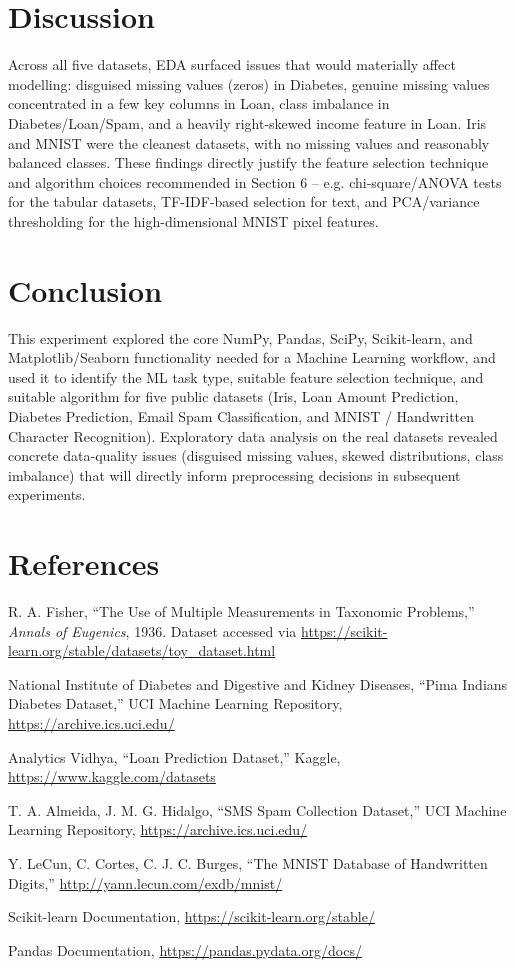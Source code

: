 \documentclass[12pt,a4paper]{article}
\begin{document}
\section{Discussion}
Across all five datasets, EDA surfaced issues that would materially affect modelling: disguised
missing values (zeros) in Diabetes, genuine missing values concentrated in a few key columns
in Loan, class imbalance in Diabetes/Loan/Spam, and a heavily right-skewed income feature in
Loan. Iris and MNIST were the cleanest datasets, with no missing values and reasonably
balanced classes. These findings directly justify the feature selection technique and
algorithm choices recommended in Section 6 -- e.g. chi-square/ANOVA tests for the tabular
datasets, TF-IDF-based selection for text, and PCA/variance thresholding for the
high-dimensional MNIST pixel features.

\section{Conclusion}
This experiment explored the core NumPy, Pandas, SciPy, Scikit-learn, and Matplotlib/Seaborn
functionality needed for a Machine Learning workflow, and used it to identify the ML task
type, suitable feature selection technique, and suitable algorithm for five public datasets
(Iris, Loan Amount Prediction, Diabetes Prediction, Email Spam Classification, and MNIST /
Handwritten Character Recognition). Exploratory data analysis on the real datasets revealed
concrete data-quality issues (disguised missing values, skewed distributions, class
imbalance) that will directly inform preprocessing decisions in subsequent experiments.

\section{References}
\begin{enumerate}[label={[\arabic*]}]
\item R. A. Fisher, ``The Use of Multiple Measurements in Taxonomic Problems,'' \textit{Annals of Eugenics}, 1936. Dataset accessed via \url{https://scikit-learn.org/stable/datasets/toy_dataset.html}
\item National Institute of Diabetes and Digestive and Kidney Diseases, ``Pima Indians Diabetes Dataset,'' UCI Machine Learning Repository, \url{https://archive.ics.uci.edu/}
\item Analytics Vidhya, ``Loan Prediction Dataset,'' Kaggle, \url{https://www.kaggle.com/datasets}
\item T. A. Almeida, J. M. G. Hidalgo, ``SMS Spam Collection Dataset,'' UCI Machine Learning Repository, \url{https://archive.ics.uci.edu/}
\item Y. LeCun, C. Cortes, C. J. C. Burges, ``The MNIST Database of Handwritten Digits,'' \url{http://yann.lecun.com/exdb/mnist/}
\item Scikit-learn Documentation, \url{https://scikit-learn.org/stable/}
\item Pandas Documentation, \url{https://pandas.pydata.org/docs/}
\end{enumerate}
\end{document}

